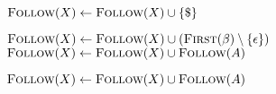 
\begin{algorithm}[H]
\begin{algorithmic}[1]
      
      \State $\follow(X) \gets \follow(X) \cup \set{\$}$
    \EndFor

    \hStatex
     
      \State $\follow(X) \gets \follow(X) \cup (\first(\beta) \setminus \set{\epsilon})$
      \If{\red{$\epsilon \in \first(\beta)$}}
        \State $\follow(X) \gets \follow(X) \cup \follow(A)$
      \EndIf
    \EndFor

    \hStatex
     
      \State $\follow(X) \gets \follow(X) \cup \follow(A)$
    \EndFor
  \EndProcedure
\end{algorithmic}
\end{algorithm}